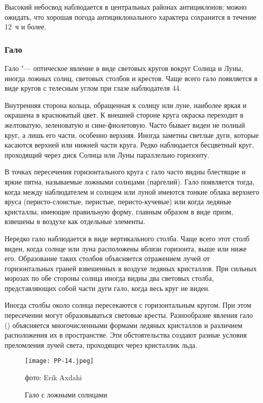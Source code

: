  Высокий небосвод наблюдается в центральных районах
антициклонов; можно ожидать, что хорошая погода антициклонального
характера сохранится в течение 12~ч и более.

\subsubsection{Гало}

Гало "--- оптическое явление в виде световых кругов вокруг Солнца и
Луны, иногда ложных солнц, световых столбов и крестов. Чаще всего гало
появляется в виде кругов с телесным углом при глазе наблюдателя 44\gr.

Внутренняя сторона кольца, обращенная к солнцу или луне, наиболее
яркая и окрашена в красноватый цвет. К внешней стороне круга окраска
переходит в желтоватую, зеленоватую и сине-фиолетовую. Часто бывает
виден не полный круг, а лишь его части, особенно верхняя. Иногда
заметны светлые дуги, которые касаются верхней или нижней части
круга. Редко наблюдается бесцветный круг, проходящий через диск Солнца
или Луны параллельно горизонту.

В точках пересечения горизонтального круга с гало часто видны
блестящие и яркие пятна, называемые ложными солнцами (паргелий). Гало
появляется тогда, когда между наблюдателем и солнцем или луной имеются
тонкие облака верхнего яруса (перисто-слоистые, перистые,
перисто-кучевые) или когда ледяные кристаллы, имеющие правильную
форму, главным образом в виде призм, взвешены в воздухе как отдельные
элементы.

Нередко гало наблюдается в виде вертикального столба. Чаще всего этот
столб виден, когда солнце или луна расположены вблизи горизонта, выше
или ниже его. Образование таких столбов объясняется отражением лучей
от горизонтальных граней взвешенных в воздухе ледяных кристаллов. При
сильных морозах по обе стороны солнца иногда видны два световых
столба, представляющих собой части дуги гало, когда весь круг не
виден.

Иногда столбы около солнца пересекаются с горизонтальным кругом. При
этом пересечении могут образовываться световые кресты. Разнообразие
явления гало () объясняется многочисленными формами ледяных
кристаллов и различием расположения их в пространстве. Эти
обстоятельства создают разные условия преломления лучей света,
проходящих через кристаллик льда.

\begin{figure}[htb]
  \centering{}
  \texttt{[image: PP-14.jpeg]}
  \caption{Гало с ложными солнцами}
  \label{fig:pp14}
  \small
  \centering{}фото: Erik Axdahi
\end{figure}

